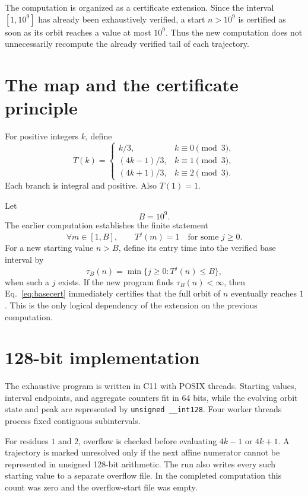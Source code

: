 \documentclass[11pt]{article}
\begin{document}
The computation is organized as a certificate extension. Since the interval $[1,10^9]$ has already been exhaustively verified, a start $n>10^9$ is certified as soon as its orbit reaches a value at most $10^9$. Thus the new computation does not unnecessarily recompute the already verified tail of each trajectory.

\section{The map and the certificate principle}
For positive integers $k$, define
\begin{equation}
T(k)=\begin{cases}
k/3,& k\equiv0\pmod3,\\
(4k-1)/3,& k\equiv1\pmod3,\\
(4k+1)/3,& k\equiv2\pmod3.
\end{cases}
\label{eq:map}
\end{equation}
Each branch is integral and positive. Also $T(1)=1$.

Let
\[
B=10^9.
\]
The earlier computation establishes the finite statement
\begin{equation}
\forall m\in[1,B],\qquad T^{j}(m)=1\quad\text{for some }j\ge0.
\label{eq:basecert}
\end{equation}
For a new starting value $n>B$, define its entry time into the verified base interval by
\[
\tau_B(n)=\min\{j\ge0:T^j(n)\le B\},
\]
when such a $j$ exists. If the new program finds $\tau_B(n)<\infty$, then Eq.~\eqref{eq:basecert} immediately certifies that the full orbit of $n$ eventually reaches $1$. This is the only logical dependency of the extension on the previous computation.

\section{128-bit implementation}
The exhaustive program is written in C11 with POSIX threads. Starting values, interval endpoints, and aggregate counters fit in 64 bits, while the evolving orbit state and peak are represented by \texttt{unsigned \_\_int128}. Four worker threads process fixed contiguous subintervals.

For residues $1$ and $2$, overflow is checked before evaluating $4k-1$ or $4k+1$. A trajectory is marked unresolved only if the next affine numerator cannot be represented in unsigned 128-bit arithmetic. The run also writes every such starting value to a separate overflow file. In the completed computation this count was zero and the overflow-start file was empty.
\end{document}

